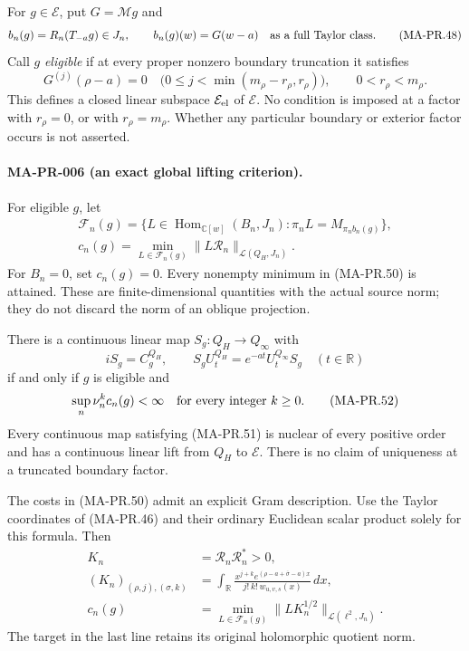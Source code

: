 For \(g\in\mathcal E\), put \(G=\mathcal Mg\) and
\[
 b_n(g)=R_n(T_{-a}g)\in J_n,\qquad
 b_n(g)(w)=G(w-a)\quad\hbox{as a full Taylor class}.
 \tag{MA-PR.48}
\]
Call \(g\) \emph{eligible} if at every proper nonzero
boundary truncation it satisfies
\[
 G^{(j)}(\rho-a)=0
       \quad\bigl(0\le j<\min(m_\rho-r_\rho,r_\rho)\bigr),
       \qquad 0<r_\rho<m_\rho .
 \tag{MA-PR.49}
\]
This defines a closed linear subspace \(\mathcal E_{\rm el}\)
of \(\mathcal E\).  No condition is imposed at a factor
with \(r_\rho=0\), or with \(r_\rho=m_\rho\).
Whether any particular boundary or exterior factor occurs
is not asserted.

\paragraph{MA-PR-006 (an exact global lifting criterion).}
For eligible \(g\), let
\[
 \begin{aligned}
 \mathcal F_n(g)
   =\{L\in\operatorname{Hom}_{\mathbb C[w]}(B_n,J_n):
                        \pi_nL=M_{\pi_nb_n(g)}\},\\
 c_n(g)=\min_{L\in\mathcal F_n(g)}
                \|L\mathscr R_n\|_{\mathcal L(Q_H,J_n)} .
 \end{aligned}
 \tag{MA-PR.50}
\]
For \(B_n=0\), set \(c_n(g)=0\).
Every nonempty minimum in (MA-PR.50) is attained.
These are finite-dimensional quantities with the actual source
norm; they do not discard the norm of an oblique projection.

There is a continuous linear map \(S_g:Q_H\to Q_\infty\)
with
\[
 iS_g=C_g^{Q_H},\qquad
 S_gU_t^{Q_H}=e^{-at}U_t^{Q_\infty}S_g
                  \quad(t\in\mathbb R)
 \tag{MA-PR.51}
\]
if and only if \(g\) is eligible and
\[
                  \sup_n\nu_n^k c_n(g)<\infty
                         \quad\hbox{for every integer }k\ge0 .
 \tag{MA-PR.52}
\]
Every continuous map satisfying (MA-PR.51) is nuclear of
every positive order and has a continuous linear lift
from \(Q_H\) to \(\mathcal E\).
There is no claim of uniqueness at a truncated boundary factor.

The costs in (MA-PR.50) admit an explicit Gram description.
Use the Taylor coordinates of (MA-PR.46) and their ordinary
Euclidean scalar product solely for this formula.  Then
\[
 \begin{aligned}
 K_n&=\mathscr R_n\mathscr R_n^*>0,\\
 (K_n)_{(\rho,j),(\sigma,k)}
   &=\int_{\mathbb R}
       \frac{x^{j+k}e^{(\rho-a+\overline{\sigma}-a)x}}
              {j!\,k!\,w_{u,v,s}(x)}\,dx,\\
 c_n(g)&=\min_{L\in\mathcal F_n(g)}
             \|LK_n^{1/2}\|_{\mathcal L(\ell^2,J_n)} .
 \end{aligned}
 \tag{MA-PR.53}
\]
The target in the last line retains its original
holomorphic quotient norm.

